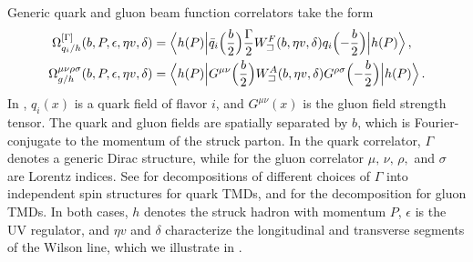 \documentclass[11pt,a4paper]{article}
\newcommand{\eps}{\epsilon}
\newcommand{\nn}{\nonumber}
\newcommand{\Corr}{\Omega}
\newcommand{\q}{q_i}
\newcommand{\staple}{\sqsupset}
\begin{document}
%
Generic quark and gluon beam function correlators take the form
\begin{align} \label{eq:beam_generic}
 \Corr_{\q/h}^{[\Gamma]}(b, P, \eps, \eta v, \delta) &
 = \Bigl\langle h(P) \Big| \bar \q\Bigl(\frac{b}{2}\Bigr) \frac{\Gamma}{2}
   W^F_\staple(b, \eta v, \delta)
   \q\Bigl(-\frac{b}{2}\Bigr) \Big| h(P) \Bigr\rangle
\,,\nn\\
 \Corr_{g/h}^{\mu\nu\rho\sigma}(b, P, \eps, \eta v, \delta) &
 = \Bigl\langle h(P) \Big| G^{\mu\nu}\Bigl(\frac{b}{2}\Bigr)
   W^A_\staple(b, \eta v, \delta)
   G^{\rho\sigma}\Bigl(-\frac{b}{2}\Bigr) \Big| h(P) \Bigr\rangle
\,.\end{align}
In , $\q(x)$ is a quark field of flavor $i$,
and $G^{\mu\nu}(x)$ is the gluon field strength tensor.
The quark and gluon fields are spatially separated by $b$,
which is Fourier-conjugate to the momentum of the struck parton.
In the quark correlator, $\Gamma$ denotes a generic Dirac structure,
while for the gluon correlator $\mu,\,\nu,\,\rho,$ and $\sigma$ are Lorentz indices.
See  for decompositions of different choices of $\Gamma$ into independent spin structures for quark TMDs, and  for the decomposition for gluon TMDs.
In both cases, $h$ denotes the struck hadron with momentum $P$,
$\eps$ is the UV regulator, and $\eta v$ and $\delta$ characterize
the longitudinal and transverse segments of the Wilson line, which we illustrate in .
\end{document}

